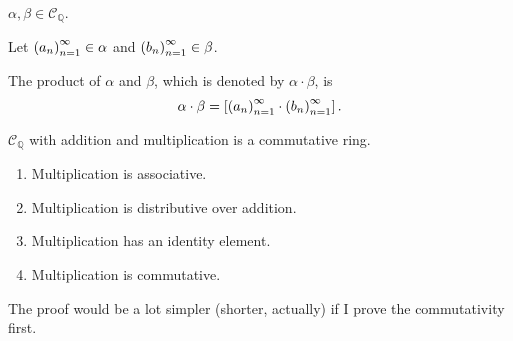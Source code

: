 \begin{definition}
    $\alpha, \beta\in\mathscr{C}_{\mathbb{Q}}$.

    Let ${\left({a_{n}}\right)}^{\infty}_{n=1}\in\alpha$ and ${\left({b_{n}}\right)}^{\infty}_{n=1}\in\beta$.

    The product of $\alpha$ and $\beta$, which is denoted by $\alpha\cdot\beta$, is
    \[
        \alpha\cdot\beta = \left[{{\left({a_{n}}\right)}^{\infty}_{n=1}\cdot{\left({b_{n}}\right)}^{\infty}_{n=1}}\right].
    \]
\end{definition}

\begin{theorem}
    $\mathscr{C}_{\mathbb{Q}}$ with addition and multiplication is a commutative ring.
    \begin{enumerate}[label={(F\arabic*)},itemsep=0pt,topsep=0pt,start=5]
        \item Multiplication is associative.
        \item Multiplication is distributive over addition.
        \item Multiplication has an identity element.
        \item Multiplication is commutative.
    \end{enumerate}
\end{theorem}

The proof would be a lot simpler (shorter, actually) if I prove the commutativity first.

